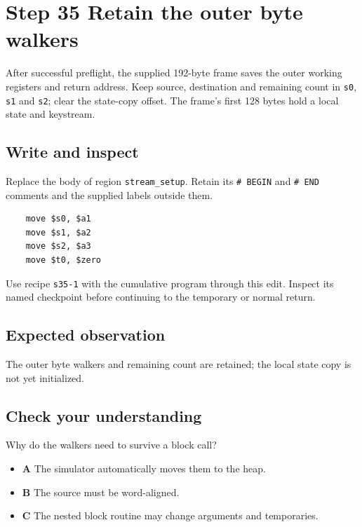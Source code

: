 \section{Step 35 Retain the outer byte walkers}\label{chacha-s35}

After successful preflight, the supplied 192-byte frame saves the outer working registers and return address. Keep source, destination and remaining count in \texttt{s0}, \texttt{s1} and \texttt{s2}; clear the state-copy offset. The frame's first 128 bytes hold a local state and keystream.

\subsection{Write and inspect}
Replace the body of region \texttt{stream\_setup}. Retain its \texttt{\# BEGIN} and \texttt{\# END} comments and the supplied labels outside them.

\begin{verbatim}
    move $s0, $a1
    move $s1, $a2
    move $s2, $a3
    move $t0, $zero
\end{verbatim}

Use recipe \texttt{s35-1} with the cumulative program through this edit. Inspect its named checkpoint before continuing to the temporary or normal return.

\subsection{Expected observation}
The outer byte walkers and remaining count are retained; the local state copy is not yet initialized.

\subsection{Check your understanding}
Why do the walkers need to survive a block call?

\begin{itemize}
  \item \textbf{A} The simulator automatically moves them to the heap.
  \item \textbf{B} The source must be word-aligned.
  \item \textbf{C} The nested block routine may change arguments and temporaries.
\end{itemize}
